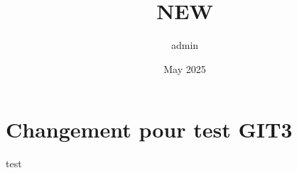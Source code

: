\documentclass{article}
\title{NEW}
\author{admin }
\date{May 2025}
\begin{document}
\maketitle

\section{Changement pour test GIT3}
test
\end{document}
